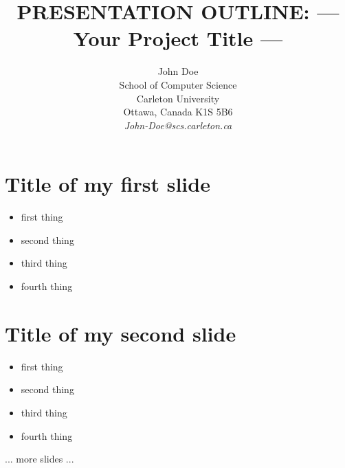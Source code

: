 \documentclass[11pt]{article}       %
\newenvironment{slide}[1]        {\section{#1} \begin{itemize}}%
                                 {\end{itemize}}
\begin{document}


\title{PRESENTATION OUTLINE: --- Your Project Title ---}


\author{
John Doe\\
School of Computer Science\\
Carleton University\\
Ottawa, Canada K1S 5B6\\
{\em John-Doe@scs.carleton.ca}
} %

\maketitle

\begin{slide}{Title of my first slide}
\item first thing
\item second thing
\item third thing
\item fourth thing
\end{slide}


\begin{slide}{Title of my second slide}
\item first thing
\item second thing
\item third thing
\item fourth thing
\end{slide}

\noindent ... more slides ...



\end{document}
